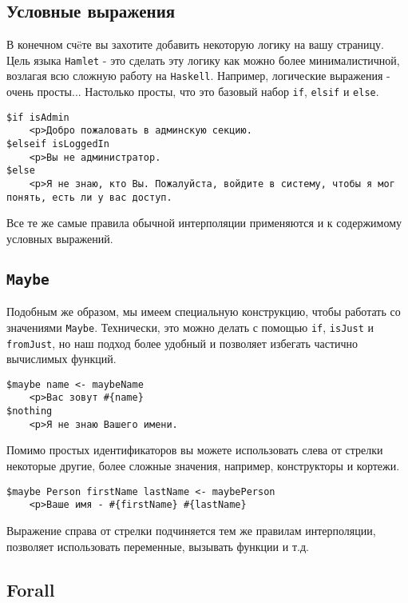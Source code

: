 \subsection{Условные выражения}

В конечном счëте вы захотите добавить некоторую логику на вашу страницу. Цель
языка \texttt{Hamlet} - это сделать эту логику как можно более минималистичной, возлагая
всю сложную работу на \texttt{Haskell}. Например, логические выражения - очень просты...
Настолько просты, что это базовый набор \texttt{if}, \texttt{elsif} и 
\texttt{else}.

\begin{lstlisting}
$if isAdmin
    <p>Добро пожаловать в админскую секцию.
$elseif isLoggedIn
    <p>Вы не администратор.
$else
    <p>Я не знаю, кто Вы. Пожалуйста, войдите в систему, чтобы я мог понять, есть ли у вас доступ.
\end{lstlisting}

Все те же самые правила обычной интерполяции применяются и к содержимому 
условных выражений.

\subsection{\lstinline!Maybe!}

Подобным же образом, мы имеем специальную конструкцию, чтобы работать 
со значениями \lstinline!Maybe!. Технически, это можно делать с помощью \texttt{if}, 
\texttt{isJust} и \texttt{fromJust}, но наш подход более удобный и позволяет
избегать частично вычислимых функций.

\begin{lstlisting}
$maybe name <- maybeName
    <p>Ваc зовут #{name}
$nothing
    <p>Я не знаю Вашего имени.
\end{lstlisting}

Помимо простых идентификаторов вы можете использовать слева от стрелки некоторые другие, 
более сложные значения, например, конструкторы и кортежи.

\begin{lstlisting}
$maybe Person firstName lastName <- maybePerson
    <p>Ваше имя - #{firstName} #{lastName}
\end{lstlisting}

Выражение справа от стрелки подчиняется тем же правилам интерполяции, 
позволяет использовать переменные, вызывать функции и т.д.

\subsection{Forall}


